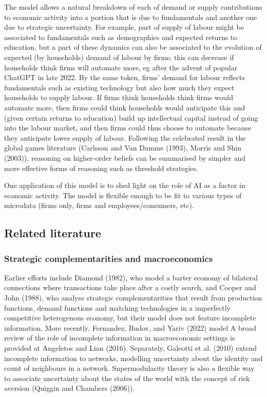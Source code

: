 \documentclass[
]{article}
\theoremstyle{plain}
\theoremstyle{definition}
\theoremstyle{remark}
\begin{document}
The model allows a natural breakdown of each of demand or supply
contributions to economic activity into a portion that is due to
fundamentals and another one due to strategic uncertainty. For example,
part of supply of labour might be associated to fundamentals such as
demographics and expected returns to education, but a part of these
dynamics can also be associated to the evolution of expected (by
households) demand of labour by firms; this can decrease if households
think firms will automate more, eg after the advent of popular ChatGPT
in late 2022. By the same token, firms' demand for labour reflects
fundamentals such as existing technology but also how much they expect
households to supply labour. If firms think households think firms would
automate more, then firms could think households would anticipate this
and (given certain returns to education) build up intellectual capital
instead of going into the labour market, and then firms could thus
choose to automate because they anticipate lower supply of labour.
Following the celebrated result in the global games literature (Carlsson
and Van Damme (1993), Morris and Shin (2003)), reasoning on higher-order
beliefs can be summarised by simpler and more effective forms of
reasoning such as threshold strategies.

One application of this model is to shed light on the role of AI as a
factor in economic activity. The model is flexible enough to be fit to
various types of microdata (firms only, firms and employees/consumers,
etc).

\subsection{Related literature}\label{related-literature}

\subsubsection{Strategic complementarities and
macroeconomics}\label{strategic-complementarities-and-macroeconomics}

Earlier efforts include Diamond (1982), who model a barter economy of
bilateral connections where transactions take place after a costly
search, and Cooper and John (1988), who analyse strategic
complementarities that result from production functions, demand
functions and matching technologies in a imperfectly competitive
heterogenous economy, but their model does not feature incomplete
information. More recently, Fernandez, Rudov, and Yariv (2022) model A
broad review of the role of incomplete information in macroeconomic
settings is provided at Angeletos and Lian (2016). Separately, Galeotti
et al. (2010) extend incomplete information to networks, modelling
uncertainty about the identity and count of neighbours in a network.
Supermodularity theory is also a flexible way to associate uncertainty
about the states of the world with the concept of risk aversion (Quiggin
and Chambers (2006)).
\end{document}
